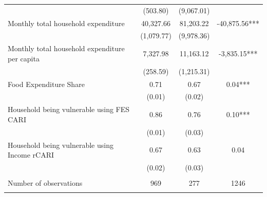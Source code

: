 \begin{tabular}{@{\extracolsep{5pt}}lccc}
 & (503.80)  & (9,067.01)  &  \\ [1ex]
Monthly total household expenditure   & 40,327.66    & 81,203.22    & -40,875.56***   \\
 & (1,079.77)  & (9,978.36)  &  \\ [1ex]
Monthly total household expenditure per capita   & 7,327.98    & 11,163.12    & -3,835.15***   \\
 & (258.59)  & (1,215.31)  &  \\ [1ex]
Food Expenditure Share   & 0.71    & 0.67    & 0.04***   \\
 & (0.01)  & (0.02)  &  \\ [1ex]
Household being vulnerable using FES CARI   & 0.86    & 0.76    & 0.10***   \\
 & (0.01)  & (0.03)  &  \\ [1ex]
Household being vulnerable using Income rCARI   & 0.67    & 0.63    & 0.04   \\
 & (0.02)  & (0.03)  &  \\ [1ex]
\hline \\[-1.8ex]
Number of observations  & 969   & 277  & 1246  \\
\hline \hline \\[-1.8ex]

\end{tabular}
